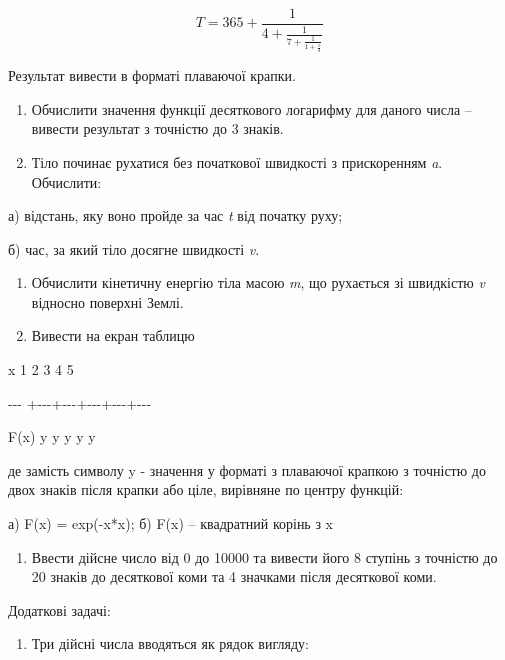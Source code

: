 \documentclass[]{article}
\begin{document}
\[T = \mathrm{365} + \frac{1}{4 + \frac{1}{7 + \frac{1}{1 + \frac{1}{3}}}}\]

Результат вивести в форматі плаваючої крапки.

\begin{enumerate}
\def\labelenumi{\arabic{enumi}.}
\item
  Обчислити значення функції десяткового логарифму для даного числа --
  вивести результат з точністю до 3 знаків.
\item
  Тіло починає рухатися без початкової швидкості з прискоренням
  \emph{a}. Обчислити:
\end{enumerate}

а) відстань, яку воно пройде за час \emph{t} від початку руху;

б) час, за який тіло досягне швидкості \emph{v}.

\begin{enumerate}
\def\labelenumi{\arabic{enumi}.}
\item
  Обчислити кінетичну енергію тіла масою \emph{m}, що рухається зі
  швидкістю \emph{v} відносно поверхні Землі.
\item
  Вивести на екран таблицю
\end{enumerate}

x \textbar{} 1 \textbar{} 2 \textbar{} 3 \textbar{} 4 \textbar{} 5

-\/-\/- +-\/-\/-+-\/-\/-+-\/-\/-+-\/-\/-+-\/-\/-

F(x)\textbar{} y \textbar{} y \textbar{} y \textbar{} y \textbar{} y

де замість символу y - значення у форматі з плаваючої крапкою з точністю
до двох знаків після крапки або ціле, вирівняне по центру функцій:

а) F(x) = exp(-x*x); б) F(x) -- квадратний корінь з x

\begin{enumerate}
\def\labelenumi{\arabic{enumi}.}
\item
  Ввести дійсне число від 0 до 10000 та вивести його 8 ступінь з
  точністю до 20 знаків до десяткової коми та 4 значками після
  десяткової коми.
\end{enumerate}

Додаткові задачі:

\begin{enumerate}
\def\labelenumi{\arabic{enumi}.}
\item
  Три дійсні числа вводяться як рядок вигляду:
\end{enumerate}
\end{document}
